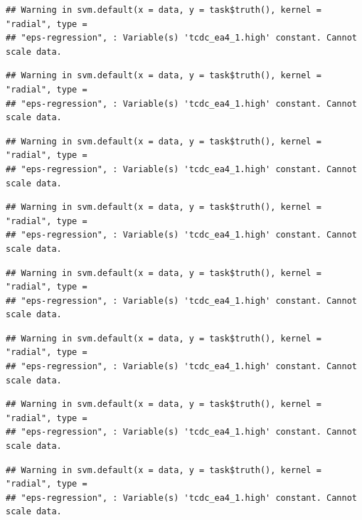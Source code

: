 \documentclass[
  11pt,
  a4paper,
]{article}
\newenvironment{Shaded}{\begin{snugshade}}{\end{snugshade}}
\newcommand{\CommentTok}[1]{\textcolor[rgb]{0.56,0.35,0.01}{\textit{#1}}}
\newcommand{\DecValTok}[1]{\textcolor[rgb]{0.00,0.00,0.81}{#1}}
\newcommand{\FunctionTok}[1]{\textcolor[rgb]{0.00,0.00,0.00}{#1}}
\newcommand{\NormalTok}[1]{#1}
\newcommand{\OtherTok}[1]{\textcolor[rgb]{0.56,0.35,0.01}{#1}}
\newcommand{\SpecialCharTok}[1]{\textcolor[rgb]{0.00,0.00,0.00}{#1}}
\begin{document}
\begin{verbatim}
## Warning in svm.default(x = data, y = task$truth(), kernel = "radial", type =
## "eps-regression", : Variable(s) 'tcdc_ea4_1.high' constant. Cannot scale data.
\end{verbatim}

\begin{verbatim}
## Warning in svm.default(x = data, y = task$truth(), kernel = "radial", type =
## "eps-regression", : Variable(s) 'tcdc_ea4_1.high' constant. Cannot scale data.
\end{verbatim}

\begin{verbatim}
## Warning in svm.default(x = data, y = task$truth(), kernel = "radial", type =
## "eps-regression", : Variable(s) 'tcdc_ea4_1.high' constant. Cannot scale data.
\end{verbatim}

\begin{verbatim}
## Warning in svm.default(x = data, y = task$truth(), kernel = "radial", type =
## "eps-regression", : Variable(s) 'tcdc_ea4_1.high' constant. Cannot scale data.
\end{verbatim}

\begin{verbatim}
## Warning in svm.default(x = data, y = task$truth(), kernel = "radial", type =
## "eps-regression", : Variable(s) 'tcdc_ea4_1.high' constant. Cannot scale data.
\end{verbatim}

\begin{verbatim}
## Warning in svm.default(x = data, y = task$truth(), kernel = "radial", type =
## "eps-regression", : Variable(s) 'tcdc_ea4_1.high' constant. Cannot scale data.
\end{verbatim}

\begin{verbatim}
## Warning in svm.default(x = data, y = task$truth(), kernel = "radial", type =
## "eps-regression", : Variable(s) 'tcdc_ea4_1.high' constant. Cannot scale data.
\end{verbatim}

\begin{verbatim}
## Warning in svm.default(x = data, y = task$truth(), kernel = "radial", type =
## "eps-regression", : Variable(s) 'tcdc_ea4_1.high' constant. Cannot scale data.
\end{verbatim}

\begin{Shaded}
\end{Shaded}
\end{document}
